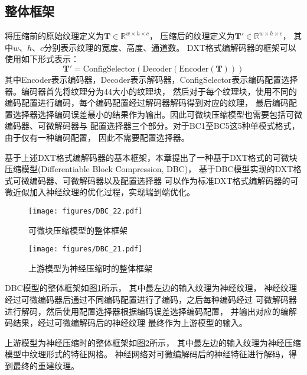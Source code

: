\subsection{整体框架}

将压缩前的原始纹理定义为$\mathbf{T}\in \mathbb{R}^{w\times h\times c}$，
压缩后的纹理定义为$\mathbf{T}'\in \mathbb{R}^{w\times h\times c}$，
其中$w$、$h$、$c$分别表示纹理的宽度、高度、通道数。
DXT格式编解码器的框架可以使用如下形式表示：
\begin{equation}
    \mathbf{T}'=\text{ConfigSelector}(\text{Decoder}(\text{Encoder}(\mathbf{T})))
\end{equation}
其中Encoder表示编码器，Decoder表示解码器，ConfigSelector表示编码配置选择器。编码器首先将纹理分为4\times4大小的纹理块，
然后对于每个纹理块，使用不同的编码配置进行编码，每个编码配置经过解码器解码得到对应的纹理，
最后编码配置选择器选择编码误差最小的结果作为输出。因此可微块压缩模型也需要包括可微编码器、可微解码器与
配置选择器三个部分。对于BC1至BC5这5种单模式格式，由于仅有一种编码配置，
因此不需要配置选择器。

基于上述DXT格式编解码器的基本框架，本章提出了一种基于DXT格式的可微块压缩模型(Differentiable Block Compression, DBC)， 
基于DBC模型实现的DXT格式可微编码器、可微解码器以及配置选择器
可以作为标准DXT格式编解码器的可微近似加入神经纹理的优化过程，实现端到端优化。

\begin{figure}[htbp]
    \centering
    \texttt{[image: figures/DBC\_22.pdf]}
    \caption{可微块压缩模型的整体框架}
    \label{fig:DBC_overview}
\end{figure}

\begin{figure}[htbp]
    \centering
    \texttt{[image: figures/DBC\_21.pdf]}
    \caption{上游模型为神经压缩时的整体框架}
    \label{fig:DBC_nm}
\end{figure}

DBC模型的整体框架如图\ref{fig:DBC_overview}所示，
其中最左边的输入纹理为神经纹理，
神经纹理经过可微编码器后通过不同编码配置进行了编码，之后每种编码经过
可微解码器进行解码，然后使用配置选择器根据编码误差选择编码配置，
并输出对应的编解码结果，经过可微编解码后的神经纹理
最终作为上游模型的输入。

上游模型为神经压缩时的整体框架如图\ref{fig:DBC_nm}所示，
其中最左边的输入纹理为神经压缩模型中纹理形式的特征网格。
神经网络对可微编解码后的神经特征进行解码，得到最终的重建纹理。

